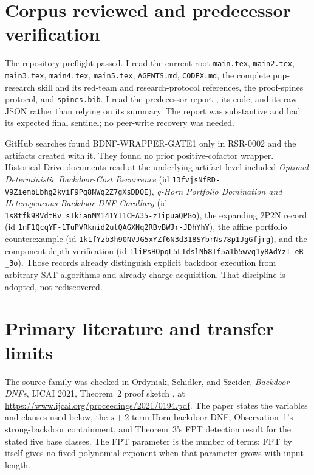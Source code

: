 \documentclass[11pt]{article}
\begin{document}
\section{Corpus reviewed and predecessor verification}
The repository preflight passed.  I read the current root
\texttt{main.tex}, \texttt{main2.tex}, \texttt{main3.tex},
\texttt{main4.tex}, \texttt{main5.tex}, \texttt{AGENTS.md},
\texttt{CODEX.md}, the complete pnp-research skill and its red-team and
research-protocol references, the proof-spines protocol, and
\texttt{spines.bib}.  I read the predecessor report
,
its code, and its raw JSON rather than relying on its summary.  The report
was substantive and had its expected final sentinel; no peer-write recovery
was needed.

GitHub searches found BDNF-WRAPPER-GATE1 only in RSR-0002 and the artifacts
created with it.  They found no prior positive-cofactor wrapper.  Historical
Drive documents read at the underlying artifact level included
\emph{Optimal Deterministic Backdoor-Cost Recurrence}
(id \texttt{13fvjsNfRD-V9ZiembLbhg2kviF9Pg8NWq2Z7gXsDDOE}),
\emph{q-Horn Portfolio Domination and Heterogeneous Backdoor-DNF Corollary}
(id \texttt{1s8tfk9BVdtBv\_sIkianMM141YI1CEA35-zTipuaQPGo}), the
expanding 2P2N record
(id \texttt{1nF1QcqYF-1TuPVRknid2utQAGXNq2RBvBWJr-JDhYhY}), the affine
portfolio counterexample
(id \texttt{1k1fYzb3h90NVJG5xYZf6N3d318SYbrNs78p1JgGfjrg}), and the
component-depth verification
(id \texttt{1liPsHOpqL5LIdslNb8Tf5a1b5wvq1y8AdYzI-eR-\_3o}).
Those records already distinguish explicit backdoor execution from arbitrary
SAT algorithms and already charge acquisition.  That discipline is adopted,
not rediscovered.

\section{Primary literature and transfer limits}
The source family was checked in Ordyniak, Schidler, and Szeider,
\emph{Backdoor DNFs}, IJCAI 2021, Theorem~2 proof sketch
\cite{ordyniak2021bdnf}, at
\url{https://www.ijcai.org/proceedings/2021/0194.pdf}.
The paper states the variables and clauses used below, the $s+2$-term
Horn-backdoor DNF, Observation~1's strong-backdoor containment, and
Theorem~3's FPT detection result for the stated five base classes.  The FPT
parameter is the number of terms; FPT by itself gives no fixed polynomial
exponent when that parameter grows with input length.
\end{document}
